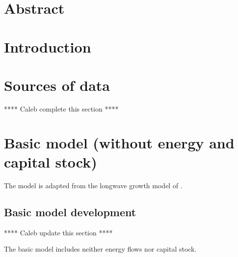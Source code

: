 \documentclass[letterpaper,12pt]{article}
\begin{document}

\section*{Abstract}


\section{Introduction}
\label{sec:Introduction}


\section{Sources of data}
\label{sec:Sources_of_data}

**** Caleb complete this section ****


\section{Basic model (without energy and capital stock)}
\label{sec:Basic_model}

The model is adapted from the longwave growth model of \citet{Jones:2001wn}. 

\subsection{Basic model development}
\label{sec:Basic_model_development}

**** Caleb update this section ****

The basic model includes neither energy flows nor capital stock.
\end{document}
